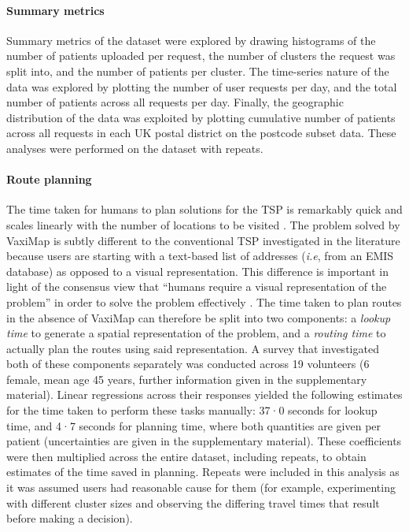 \documentclass[review]{elsarticle}
\def\vm{VaxiMap}
\begin{document}
\paragraph{Summary metrics}
Summary metrics of the dataset were explored by drawing histograms of the number of patients uploaded per request, the number of clusters the request was split into, and the number of patients per cluster. The time-series nature of the data was explored by plotting the number of user requests per day, and the total number of patients across all requests per day. Finally, the geographic distribution of the data was exploited by plotting cumulative number of patients across all requests in each UK postal district on the postcode subset data. These analyses were performed on the dataset with repeats. 

\paragraph{Route planning}
The time taken for humans to plan solutions for the TSP is remarkably quick and scales linearly with the number of locations to be visited \cite{Macgregor1996, Dry2006, MacGregor2011}. The problem solved by \vm{} is subtly different to the conventional TSP investigated in the literature because users are starting with a text-based list of addresses (\textit{i.e}, from an EMIS database) as opposed to a visual representation. This difference is important in light of the consensus view that ``humans require a visual representation of the problem'' in order to solve the problem effectively \cite{MacGregor2011}. The time taken to plan routes in the absence of \vm{} can therefore be split into two components: a \textit{lookup time} to generate a spatial representation of the problem, and a \textit{routing time} to actually plan the routes using said representation. A survey that investigated both of these components separately was conducted across 19 volunteers (6 female, mean age 45 years, further information given in the supplementary material). Linear regressions across their responses yielded the following estimates for the time taken to perform these tasks manually: 37·0 seconds for lookup time, and 4·7 seconds for planning time, where both quantities are given per patient (uncertainties are given in the supplementary material). These coefficients were then multiplied across the entire dataset, including repeats, to obtain estimates of the time saved in planning. Repeats were included in this analysis as it was assumed users had reasonable cause for them (for example, experimenting with different cluster sizes and observing the differing travel times that result before making a decision). 
\end{document}
